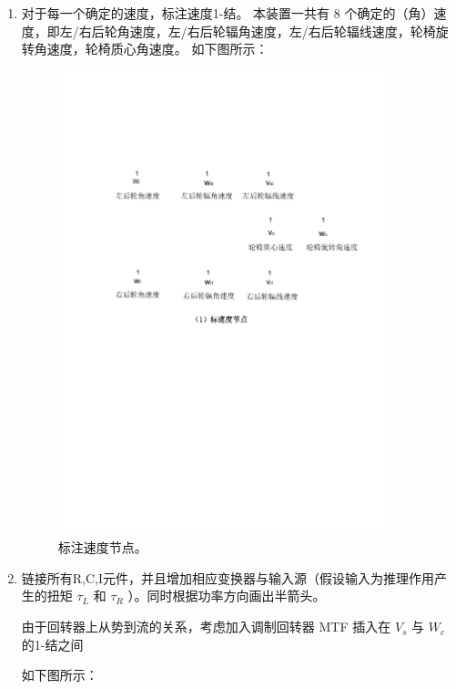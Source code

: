 \begin{enumerate}
	\item 对于每一个确定的速度，标注速度1-结。
	本装置一共有 8 个确定的（角）速度，即左/右后轮角速度，左/右后轮辐角速度，左/右后轮辐线速度，轮椅旋转角速度，轮椅质心角速度。
	如下图所示：
	
	\begin{figure}[!h]
		\centering
		\includegraphics[width=0.9\textwidth]{fig/3_1_bond.pdf}
		\caption{标注速度节点。}\label{fig:4_1_bond}
	\end{figure}
	
	\clearpage
	
	\item 链接所有R,C,I元件，并且增加相应变换器与输入源（假设输入为推理作用产生的扭矩 $ \tau_L $ 和 $ \tau_R $ ）。同时根据功率方向画出半箭头。
	
	由于回转器上从势到流的关系，考虑加入调制回转器 MTF 插入在 $ V_s $ 与 $ W_c $ 的1-结之间
	
	如下图所示：
	

\end{enumerate}
